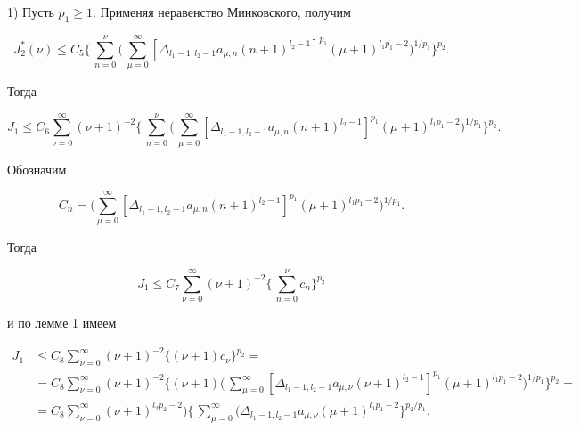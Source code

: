  


1) Пусть $p_1\ge 1$. Применяя неравенство Минковского, получим 


$$ 


J_2^*(\nu)\le C_5\biggl\{\,\sum^\nu_{n=0}\biggl(\, 


\sum^\infty_{\mu=0} 


[\Delta_{l_1-1,l_2-1}a_{\mu,n}(n+1)^{l_2-1}]^{p_1}(\mu+1)^{l_1p_1-2} 


\biggr)^{1/p_1}\biggr\}^{p_2}.


$$ 


Тогда 


$$ 


J_1 \le C_6\sum^\infty_{\nu=0}(\nu+1)^{-2}\biggl\{\,\sum^\nu_{n=0}\biggl(\, 


\sum^\infty_{\mu=0} 


[\Delta_{l_1-1,l_2-1}a_{\mu,n}(n+1)^{l_2-1}]^{p_1}(\mu+1)^{l_1p_1-2} 


\biggr)^{1/p_1}\biggr\}^{p_2}.


$$ 


Обозначим 


$$ 


C_n=\biggl(\sum^\infty_{\mu=0} 


[\Delta_{l_1-1,l_2-1}a_{\mu,n}(n+1)^{l_2-1}]^{p_1}(\mu+1)^{l_1p_1-2} 


\biggr)^{1/p_1}. 


$$ 


Тогда 


$$ 


J_1\le C_7\sum^\infty_{\nu=0}(\nu+1)^{-2}\biggl\{\, 


\sum^\nu_{n=0}c_n\biggr\}^{p_2} 


$$ 


и по лемме 1 имеем 


\begin{align*} 


J_1&\le C_8\sum^\infty_{\nu=0}(\nu+1)^{-2}\{(\nu+1)c_\nu\}^{p_2}=\\ 


% 


&=C_8\sum^\infty_{\nu=0}(\nu+1)^{-2}\biggl\{(\nu+1) 


\biggl(\,\sum^\infty_{\mu=0} 


[\Delta_{l_1-1,l_2-1}a_{\mu,\nu}(\nu+1)^{l_2-1}]^{p_1}(\mu+1)^{l_1p_1-2} 


\biggr)^{1/p_1}\biggr\}^{p_2}=\\ 


% 


&=C_8\sum^\infty_{\nu=0}(\nu+1)^{l_2p_2-2})\biggl\{\, 


\sum^\infty_{\mu=0} 


(\Delta_{l_1-1,l_2-1}a_{\mu,\nu}(\mu+1)^{l_1p_1-2} 


\biggr\}^{p_2/p_1}.


\end{align*} 


